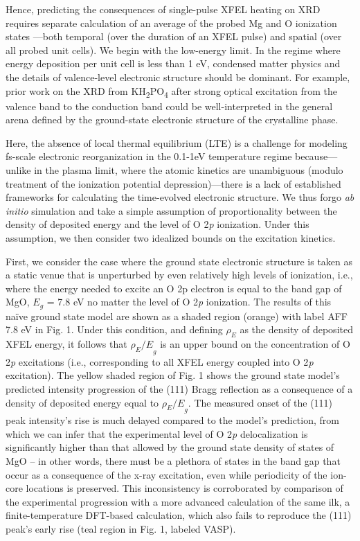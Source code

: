 Hence, predicting the consequences of single-pulse XFEL heating on XRD
requires separate calculation of an average of the probed Mg and O
ionization states ---both temporal (over the duration of an XFEL pulse)
and spatial (over all probed unit cells). We begin with the low-energy
limit. In the regime where energy deposition per unit cell is less than
1 eV, condensed matter physics and the details of valence-level
electronic structure should be dominant. For example, prior work on the
XRD from KH\textsubscript{2}PO\textsubscript{4} after strong optical
excitation from the valence band to the conduction band could be
well-interpreted in the general arena defined by the ground-state
electronic structure of the crystalline phase. \cite{zamponi2012ultrafast}

Here, the absence of local thermal equilibrium (LTE) is a challenge for
modeling fs-scale electronic reorganization in the 0.1-1eV temperature
regime because---unlike in the plasma limit, where the atomic kinetics
are unambiguous (modulo treatment of the ionization potential
depression)---there is a lack of established frameworks for calculating
the time-evolved electronic structure. We thus forgo \emph{ab initio}
simulation and take a simple assumption of proportionality between the
density of deposited energy and the level of O 2\emph{p} ionization.
Under this assumption, we then consider two idealized bounds on the
excitation kinetics.

First, we consider the case where the ground state electronic structure
is taken as a static venue that is unperturbed by even relatively high
levels of ionization, i.e., where the energy needed to excite an O 2p
electron is equal to the band gap of MgO, \(E_{g}\) = 7.8 eV no matter
the level of O 2\emph{p} ionization. The results of this naïve ground
state model are shown as a shaded region (orange) with label AFF 7.8 eV
in Fig. 1. Under this condition, and defining \(\rho_{E}\) as the
density of deposited XFEL energy, it follows that \({\rho_{E}/E}_{g}\)
is an upper bound on the concentration of O 2\emph{p} excitations (i.e.,
corresponding to all XFEL energy coupled into O 2\emph{p} excitation).
The yellow shaded region of Fig. 1 shows the ground state model's
predicted intensity progression of the (111) Bragg reflection as a
consequence of a density of deposited energy equal to
\({\rho_{E}/E}_{g}.\) The measured onset of the (111) peak intensity's
rise is much delayed compared to the model's prediction, from which we
can infer that the experimental level of O 2\emph{p} delocalization is
significantly higher than that allowed by the ground state density of
states of MgO -- in other words, there must be a plethora of states in
the band gap that occur as a consequence of the x-ray excitation, even
while periodicity of the ion-core locations is preserved. This
inconsistency is corroborated by comparison of the experimental
progression with a more advanced calculation of the same ilk, a
finite-temperature DFT-based calculation, which also fails to reproduce
the (111) peak's early rise (teal region in Fig. 1, labeled VASP).

